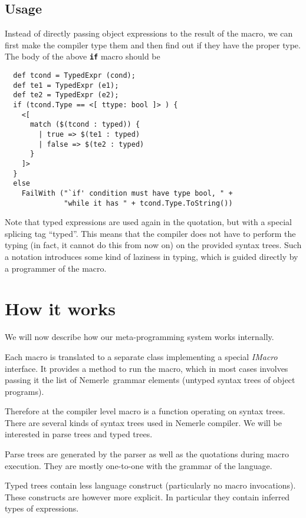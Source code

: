 \documentclass{llncs}
\newcommand{\nem}[0]{Nemerle}
\newcommand{\kw}[1]{{\tt \bf #1}}
\begin{document}
\subsection{Usage}
Instead of directly passing object expressions to the result of the macro, we
can first make the compiler type them and then find out if they have the proper
type. The body of the above \kw{if} macro should be

\begin{verbatim}
  def tcond = TypedExpr (cond);
  def te1 = TypedExpr (e1);
  def te2 = TypedExpr (e2);
  if (tcond.Type == <[ ttype: bool ]> ) {
    <[ 
      match ($(tcond : typed)) { 
        | true => $(te1 : typed) 
        | false => $(te2 : typed) 
      } 
    ]>
  }
  else
    FailWith ("`if' condition must have type bool, " +
              "while it has " + tcond.Type.ToString())
\end{verbatim}

Note that typed expressions are used again in the quotation, but with a special 
splicing tag ``typed''. This means that the compiler does not have to perform the 
typing (in fact, it cannot do this from now on) on the provided syntax trees. 
Such a notation introduces some kind of laziness in typing, which is guided
directly by a programmer of the macro.

\section{How it works}
We will now describe how our meta-programming system works internally. 

Each macro is translated to a separate class implementing a special
\emph{IMacro} interface. It provides a method to run the macro, which
in most cases involves passing it the list of \nem\ grammar elements
(untyped syntax trees of object programs).

Therefore at the compiler level macro is a function operating on
syntax trees. There are several kinds of syntax trees used in Nemerle
compiler. We will be interested in parse trees and typed trees.

Parse trees are generated by the parser as well as the quotations during
macro execution. They are mostly one-to-one with the grammar of the
language.

Typed trees contain less language construct (particularly no macro
invocations). These constructs are however more explicit. In particular
they contain inferred types of expressions.
\end{document}
